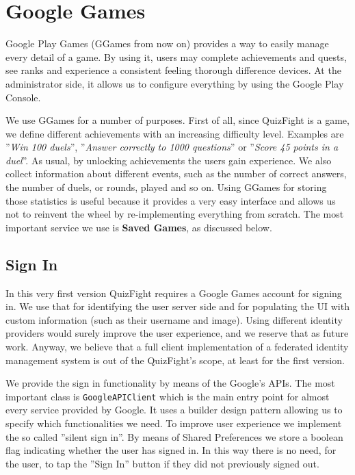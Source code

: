 \section{Google Games}
Google Play Games (GGames from now on) provides a way to easily manage every detail of a game. By using it, users may complete achievements and quests, see ranks and experience a consistent feeling thorough difference devices. At the administrator side, it allows us to configure everything by using the Google Play Console.

We use GGames for a number of purposes. First of all, since QuizFight is a game, we define different achievements with an increasing difficulty level. Examples are ''\textit{Win 100 duels}'', ''\textit{Answer correctly to 1000 questions}'' or ''\textit{Score 45 points in a duel}''. As usual, by unlocking achievements the users gain experience. We also collect information about different events, such as the number of correct answers, the number of duels, or rounds, played and so on. Using GGames for storing those statistics is useful because it provides a very easy interface and allows us not to reinvent the wheel by re-implementing everything from scratch. The most important service we use is \textbf{Saved Games}, as discussed below.

\subsection{Sign In}
In this very first version QuizFight requires a Google Games account for signing in. We use that for identifying the user server side and for populating the UI with custom information (such as their username and image). Using different identity providers would surely improve the user experience, and we reserve that as future work. Anyway, we believe that a full client implementation of a federated identity management system is out of the QuizFight's scope, at least for the first version.

We provide the sign in functionality by means of the Google's APIs. The most important class is \texttt{GoogleAPIClient} which is the main entry point for almost every service provided by Google. It uses a builder design pattern allowing us to specify which functionalities we need. To improve user experience we implement the so called ''silent sign in''. By means of Shared Preferences we store a boolean flag indicating whether the user has signed in. In this way there is no need, for the user, to tap the ''Sign In'' button if they did not previously signed out. 

